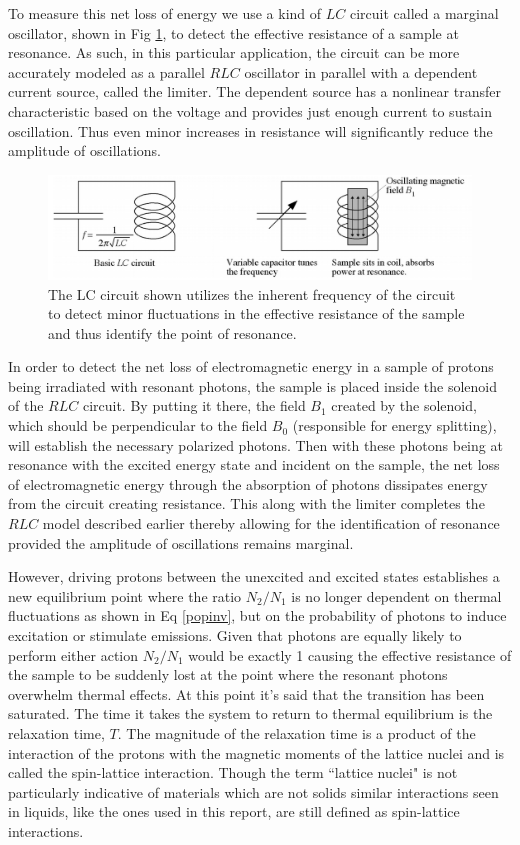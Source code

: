 \documentclass[prb,preprint]{revtex4-1}
\begin{document}
To measure this net loss of energy we use a kind of $LC$ circuit called a marginal oscillator, shown in Fig \ref{LC}, to detect the effective resistance of a sample at resonance. As such, in this particular application, the circuit can be more accurately modeled as a parallel $RLC$ oscillator in parallel with a dependent current source, called the limiter. The dependent source has a nonlinear transfer characteristic based on the voltage and provides just enough current to sustain oscillation. Thus even minor increases in resistance will significantly reduce the amplitude of oscillations.

\begin{figure}[h!]
\centering
\includegraphics[width=.8\textwidth]{LC.png}
\caption{The LC circuit shown utilizes the inherent frequency of the circuit to detect minor fluctuations in the effective resistance of the sample and thus identify the point of resonance.}
\label{LC}
\end{figure}

In order to detect the net loss of electromagnetic energy in a sample of protons being irradiated with resonant photons, the sample is placed inside the solenoid of the $RLC$ circuit. By putting it there, the field $B_1$ created by the solenoid, which should be perpendicular to the field $B_0$ (responsible for energy splitting), will establish the necessary polarized photons. Then with these photons being at resonance with the excited energy state and incident on the sample, the net loss of electromagnetic energy through the absorption of photons dissipates energy from the circuit creating resistance. This along with the limiter completes the $RLC$ model described earlier thereby allowing for the identification of resonance provided the amplitude of oscillations remains marginal.

However, driving protons between the unexcited and excited states establishes a new equilibrium point where the ratio $N_2/N_1$ is no longer dependent on thermal fluctuations as shown in Eq \eqref{popinv}, but on the probability of photons to induce excitation or stimulate emissions. Given that photons are equally likely to perform either action $N_2/N_1$ would be exactly 1 causing the effective resistance of the sample to be suddenly lost at the point where the resonant photons overwhelm thermal effects. At this point it's said that the transition has been saturated. The time it takes the system to return to thermal equilibrium is the relaxation time, $T$. The magnitude of the relaxation time is a product of the interaction of the protons with the magnetic moments of the lattice nuclei and is called the spin-lattice interaction. Though the term ``lattice nuclei" is not particularly indicative of materials which are not solids similar interactions seen in liquids, like the ones used in this report, are still defined as spin-lattice interactions.
\end{document}
